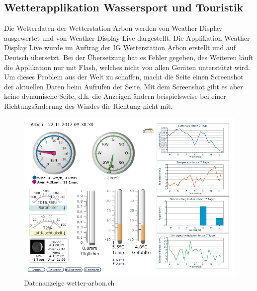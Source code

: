\documentclass[a4paper,ngerman, 11pt]{report}
\begin{document}
\subsection{Wetterapplikation Wassersport und Touristik}
Die Wetterdaten der Wetterstation Arbon werden von Weather-Display ausgewertet und von Weather-Display Live dargestellt. Die Applikation Weather-Display Live wurde im Auftrag der IG Wetterstation Arbon erstellt und auf Deutsch übersetzt. Bei der Übersetzung hat es Fehler gegeben, des Weiteren läuft die Applikation nur mit Flash, welches nicht von allen Geräten unterstützt wird. Um dieses Problem aus der Welt zu schaffen, macht die Seite einen Screenshot der aktuellen Daten beim Aufrufen der Seite. Mit dem Screenshot gibt es aber keine dynamische Seite, d.h. die Anzeigen ändern beispielsweise bei einer Richtungsänderung des Windes die Richtung nicht mit.  
\begin{figure}[htbp]
	\centering
	\includegraphics[width=0.9\linewidth]{img/grafik}
	\caption{Datenanzeige wetter-arbon.ch}
	\label{img:grafik-dummy}
\end{figure}
\end{document}
